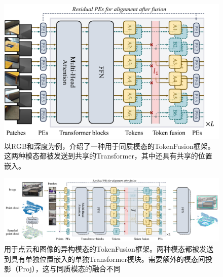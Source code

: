 \begin{figure}[t!]
	\centering
	\hskip0.07in
	\includegraphics[scale=0.42]{figures/mixt-ho.pdf}
	\caption[]{以RGB和深度为例，介绍了一种用于同质模态的TokenFusion框架。这两种模态都被发送到共享的Transformer，其中还具有共享的位置嵌入。}
	\label{pic:framework}
	\vskip-0.1in
\end{figure}

\begin{figure}[t!]
	\centering
	\includegraphics[scale=0.42]{figures/mixt-he.pdf}
	\caption[]{用于点云和图像的异构模态的TokenFusion框架。两种模态都被发送到具有单独位置嵌入的单独Transformer模块。需要额外的模态间投影（Proj），这与同质模态的融合不同
	}
	\label{pic:framework-hete}
	\vskip-0.1in
\end{figure}




